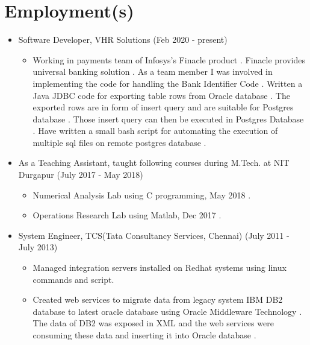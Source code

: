 \documentclass[a4paper,10pt]{article}
\begin{document}
	\section{Employment(s)}
	\begin{itemize}
	        \item Software Developer, VHR Solutions (Feb 2020 - present)
                \begin{itemize}
                    \item Working in payments team of Infosys’s Finacle product . Finacle provides universal banking solution . As a team member I was involved in implementing the code for handling the Bank Identifier Code . Written a Java JDBC code for exporting table rows from Oracle database . The exported rows are in form of insert query and are suitable for Postgres database . Those insert query can then be executed in Postgres Database . Have written a small bash script for automating the execution of multiple sql files on remote postgres database .
                \end{itemize}
			\item As  a Teaching Assistant, taught following courses during M.Tech. at NIT Durgapur (July 2017 - May 2018)
                \begin{itemize}
                    \item Numerical Analysis Lab using C programming, May 2018 .
                    \item Operations Research Lab using Matlab, Dec 2017 .
                \end{itemize}
            \item System Engineer, TCS(Tata Consultancy Services, Chennai) (July 2011 - July 2013)
		        \begin{itemize}
			    	\item Managed integration servers installed on Redhat systems using linux commands and script.
					\item Created web services to migrate data from legacy system IBM DB2 database to latest oracle database using Oracle Middleware Technology .
					The data  of DB2 was exposed in XML  and the web services were consuming these data and inserting it into Oracle database .
			\end{itemize}
	\end{itemize}
    
    
\end{document}
